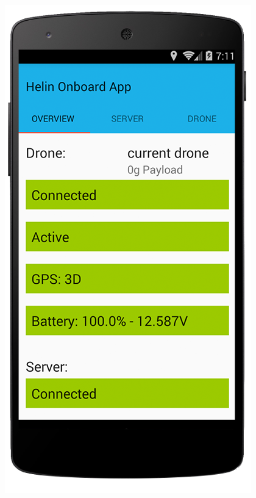 \begin{figure}[H]
	\hfill
	\begin{minipage}[b]{0.2\textwidth}
			\centering
		\includegraphics[width=\textwidth]{images/onboard-app.png}
		\label{fig:onboard-app-android}
	\end{minipage}
\end{figure}


